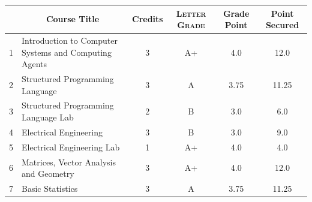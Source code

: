 \documentclass[11pt]{article}
\newcommand*{\numtwo}[1]{\pgfmathprintnumber[
                    fixed, precision=2, fixed zerofill=true]{#1}}
\begin{document}
                \begin{center}
                    \renewcommand{\arraystretch}{1.08}
                    
                \begin{tabular}{|c|l|c|>{\scshape}c|c|c|}
                \hline  \rule[-1ex]{0pt}{3.5ex} {\centering{\bf Course Code}} &  \multicolumn{1}{c|}{\textbf{Course Title}}  & {\bf Credits} & {\bf Letter Grade} & {\bf Grade Point} & {\bf Point Secured}  \\ 
                \hline   1 &  Introduction to Computer Systems and Computing Agents		 & 3 & A+ & 4.0 & 12.0 \\ %
                \hline   2 &  Structured Programming Language		 & 3 & A & 3.75 & 11.25 \\ %
                \hline   3 &  Structured Programming Language Lab		 & 2 & B & 3.0 & 6.0 \\ %
                \hline   4 &  Electrical Engineering		 & 3 & B & 3.0 & 9.0 \\ %
                \hline   5 &  Electrical Engineering Lab		 & 1 & A+ & 4.0 & 4.0 \\ %
                \hline   6 &  Matrices, Vector Analysis and Geometry		 & 3 & A+ & 4.0 & 12.0 \\ %
                \hline   7 &  Basic Statistics		 & 3 & A & 3.75 & 11.25 \\ %

\hline                %
                \end{tabular}
                \end{center}
                \renewcommand{\arraystretch}{1.03}
\end{document}
